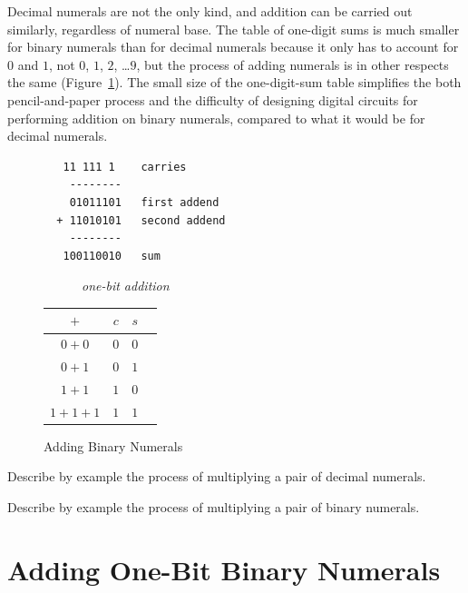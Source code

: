 Decimal numerals are not the only kind,
and addition can be carried out similarly, regardless of numeral base.
The table of one-digit sums is much smaller for binary numerals
than for decimal numerals because it only has to account for $0$ and $1$,
not $0$, $1$, $2$, \dots $9$, but
the process of adding numerals is in other respects
the same (Figure~\ref{fig:adding-binary-numerals}).
The small size of the one-digit-sum table simplifies the
both pencil-and-paper process and the difficulty of designing
digital circuits for performing addition on binary numerals, compared to what
it would be for decimal numerals.

\begin{figure}[!tbp]
\begin{center}
\begin{minipage}[b]{0.4\textwidth}
\begin{verbatim}
   11 111 1    carries
    --------
    01011101   first addend
  + 11010101   second addend
    --------
   100110010   sum
\end{verbatim}
\end{minipage}
\hfill
\begin{minipage}[b]{0.4\textwidth}
~~~~~~\emph{one-bit addition}\\
\vspace{.05 in}
\begin{tabular}{|c|c|c|c}
 \hline
 $+$      & $c$ & $s$ \\
 \hline
 $0+0$    & $0$ & $0$ \\
 \hline
 $0+1$    & $0$ & $1$ \\
 \hline
 $1+1$    & $1$ & $0$ \\
 \hline
 $1+1+1$  & $1$ & $1$ \\
 \hline
\end{tabular}
\end{minipage}
\end{center}
\caption{Adding Binary Numerals}
\label{fig:adding-binary-numerals}
\end{figure}

\begin{ExerciseList}
\Exercise Describe by example the process of multiplying a pair of decimal numerals.

\Exercise Describe by example the process of multiplying a pair of binary numerals.
\end{ExerciseList}

\section{Adding One-Bit Binary Numerals}
\label{sec:adding-1-bit-numerals}

